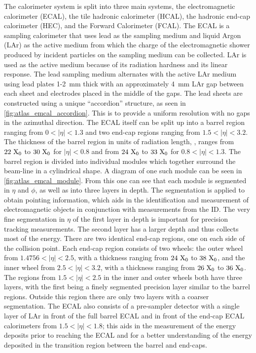 The calorimeter system is split into three main systems, 
the electromagnetic calorimeter (ECAL), the 
tile hadronic calorimeter (HCAL), the hadronic 
end-cap calorimeter (HEC), 
and the Forward Calorimeter (FCAL).
The ECAL is a sampling calorimeter that uses lead as the sampling
medium and liquid Argon (LAr) as
the active medium from which the charge of the electromagnetic
shower produced by incident particles on the sampling medium
can be collected.  LAr is used as the active medium 
because of its radiation hardness and its linear response.
The lead sampling medium alternates with the active LAr medium
using lead plates 1-2~mm thick with an approximately 4~mm 
LAr gap between each sheet and electrodes placed in the middle of
the gaps.
The lead sheets are constructed using a unique ``accordion'' structure,
as seen in \fig\ref{fig:atlas_emcal_accordion}. 
This is to provide a uniform resolution with no gaps
in the azimuthal direction.
The ECAL itself can be split up into a barrel region ranging
from $0<|\eta|<1.3$ and two end-cap regions ranging from 
$1.5 < |\eta| < 3.2$.
The thickness of the barrel region in units of radiation length, \xzero,
ranges from $22~\textrm{X}_0$ to $30~\textrm{X}_0$
for $|\eta|<0.8$ and from $24~\textrm{X}_0$ to $33~\textrm{X}_0$ for
$0.8 < |\eta| < 1.3$.
The barrel region is divided into individual modules
which together surround the beam-line
in a cylindrical shape.  A diagram of one such module
can be seen in \fig\ref{fig:atlas_emcal_module}.
From this one can see that each module is segmented in $\eta$
and $\phi$, as well as into three layers in depth.
The segmentation is applied to obtain pointing information, 
which aids in the identification and measurement of electromagnetic
objects in conjunction with measurements from the ID.
The very fine segmentation in $\eta$ of the first layer
in depth is important for precision tracking measurements.
The second layer has a larger depth and thus collects most of the energy.
There are two identical end-cap regions, one on each side of the 
collision point. Each end-cap region consists of two wheels: the 
outer wheel from $1.4756 < |\eta| < 2.5$, with a thickness ranging from
$24~\textrm{X}_0$ to $38~\textrm{X}_0$, and 
the inner wheel from $2.5 < |\eta| < 3.2$, with a thickness ranging from
$26~\textrm{X}_0$ to $36~\textrm{X}_0$.
The regions from $1.5 < |\eta|<2.5$ in the inner and outer wheels both
have three layers, with the first being a finely segmented precision
layer similar to the barrel regions. Outside this region there 
are only two layers with a coarser segmentation.
The ECAL also consists of a pre-sampler detector with a single layer of LAr in 
front of the full barrel ECAL and in front of the end-cap ECAL calorimeters
from $1.5 < |\eta| < 1.8$; this aids in the measurement of the energy deposits
prior to reaching the ECAL and for a better understanding of the energy deposited
in the transition region between the barrel and end-caps.


